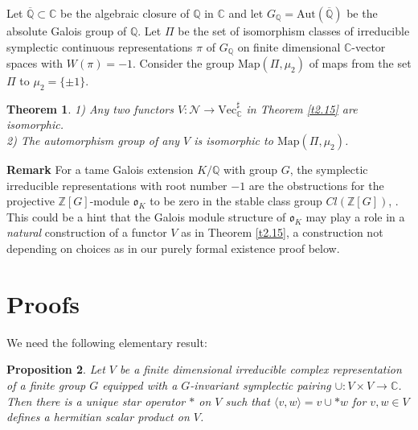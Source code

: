 \documentclass[12pt,leqno]{article}
\newcommand{\C}{{\mathbb{C}}}
\newcommand{\Q}{{\mathbb{Q}}}
\newcommand{\oQ}{\overline{\Q}}
\newcommand{\Z}{{\mathbb{Z}}}
\newcommand{\Map}{\mathrm{Map}}
\newcommand{\Aut}{\mathrm{Aut}}
\newcommand{\nVec}{\mathrm{Vec}}
\newcommand{\Nh}{{\mathcal N}}
\newcommand{\eo}{\mathfrak{o}}
\newtheorem{theorem}{Theorem}[section]
\newtheorem{prop}[theorem]{Proposition}
\begin{document}
Let $\oQ \subset \C$ be the algebraic closure of $\Q$ in $\C$ and let $G_{\Q} = \Aut (\oQ)$ be the absolute Galois group of $\Q$. Let $\Pi$ be the set of isomorphism classes of irreducible symplectic continuous representations $\pi$ of $G_{\Q}$ on finite dimensional $\C$-vector spaces with $W (\pi) = -1$. Consider the group $\Map ( \Pi , \mu_2)$ of maps from the set $\Pi$ to $\mu_2 = \{ \pm 1 \}$. 

\begin{theorem}
\label{t2.17}
1) Any two functors $V : \Nh \to \nVec^{\sharp}_{\C}$ in Theorem \ref{t2.15} are isomorphic.\\
2) The automorphism group of any $V$ is isomorphic to $\Map (\Pi , \mu_2)$.
\end{theorem}

\textbf{Remark} For a tame Galois extension $K / \Q$ with group $G$, the symplectic irreducible representations with root number $-1$ are the obstructions for the projective $\Z [G]$-module $\eo_K$ to be zero in the stable class group $Cl (\Z [G])$, \cite{T}. This could be a hint that the Galois module structure of $\eo_K$ may play a role in a \textit{natural} construction of a functor $V$ as in Theorem \ref{t2.15}, a construction not depending on choices as in our purely formal existence proof below.
%
\section{Proofs} \label{sec:3}

We need the following elementary result:

\begin{prop}
\label{t3.1}
Let $V$ be a finite dimensional irreducible complex representation of a finite group $G$ equipped with a $G$-invariant symplectic pairing $\cup : V \times V \to \C$. Then there is a unique star operator $*$ on $V$ such that $\langle v, w \rangle = v \cup *w$ for $v,w \in V$ defines a hermitian scalar product on $V$.
\end{prop}
\end{document}
